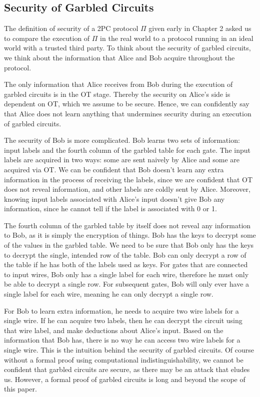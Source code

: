 \subsection{Security of Garbled Circuits}
The definition of security of a 2PC protocol $\Pi$ given early in Chapter 2 asked us to compare the execution of $\Pi$ in the real world to a protocol running in an ideal world with a trusted third party.
To think about the security of garbled circuits, we think about the information that Alice and Bob acquire throughout the protocol.

The only information that Alice receives from Bob during the execution of garbled circuits is in the OT stage.
Thereby the security on Alice's side is dependent on OT, which we assume to be secure.
Hence, we can confidently say that Alice does not learn anything that undermines security during an execution of garbled circuits.

The security of Bob is more complicated.
Bob learns two sets of information: input labels  and the fourth column of the garbled table for each gate.
The input labels are acquired in two ways: some are sent naively by Alice and some are acquired via OT.
We can be confident that Bob doesn't learn any extra information in the process of receiving the labels, since we are confident that OT does not reveal information, and other labels are coldly sent by Alice.
Moreover, knowing input labels associated with Alice's input doesn't give Bob any information, since he cannot tell if the label is associated with 0 or 1.

The fourth column of the garbled table by itself does not reveal any information to Bob, as it is simply the encryption of things.
Bob has the keys to decrypt some of the values in the garbled table.
We need to be sure that Bob only has the keys to decrypt the single, intended row of the table.
Bob can only decrypt a row of the table if he has both of the labels used as keys.
For gates that are connected to input wires, Bob only has a single label for each wire, therefore he must only be able to decrypt a single row.
For subsequent gates, Bob will only ever have a single label for each wire, meaning he can only decrypt a single row.

For Bob to learn extra information, he needs to acquire two wire labels for a single wire.
If he can acquire two labels, then he can decrypt the circuit using that wire label, and make deductions about Alice's input. 
Based on the information that Bob has, there is no way he can access two wire labels for a single wire.
This is the intuition behind the security of garbled circuits.
Of course without a formal proof using computational indistinguishability, we cannot be confident that garbled circuits are secure, as there may be an attack that eludes us.
However, a formal proof of garbled circuits is long and beyond the scope of this paper. 

